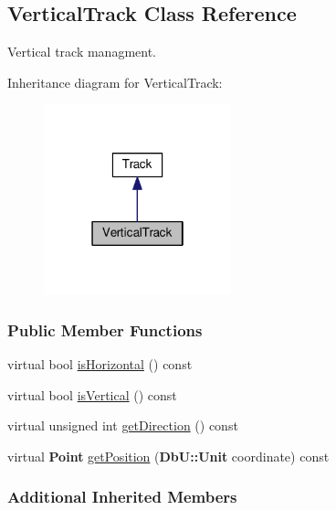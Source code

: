 \hypertarget{classKite_1_1VerticalTrack}{\subsection{Vertical\-Track Class Reference}
\label{classKite_1_1VerticalTrack}
}


Vertical track managment.  




Inheritance diagram for Vertical\-Track\-:\nopagebreak
\begin{figure}[H]
\begin{center}
\leavevmode
\includegraphics[width=154pt]{classKite_1_1VerticalTrack__inherit__graph}
\end{center}
\end{figure}
\subsubsection*{Public Member Functions}
\begin{DoxyCompactItemize}
\item 
virtual bool \hyperlink{classKite_1_1VerticalTrack_ac46ac3b48d712750c7888b48964ac189}{is\-Horizontal} () const 
\item 
virtual bool \hyperlink{classKite_1_1VerticalTrack_a2bb30e82aad1f321af4a065338775f36}{is\-Vertical} () const 
\item 
virtual unsigned int \hyperlink{classKite_1_1VerticalTrack_a09d03fbca9ab891c2f25bdae7f89a899}{get\-Direction} () const 
\item 
virtual {\bf Point} \hyperlink{classKite_1_1VerticalTrack_a87f1520092c5421a57aa2468d2814c09}{get\-Position} ({\bf Db\-U\-::\-Unit} coordinate) const 
\end{DoxyCompactItemize}
\subsubsection*{Additional Inherited Members}


